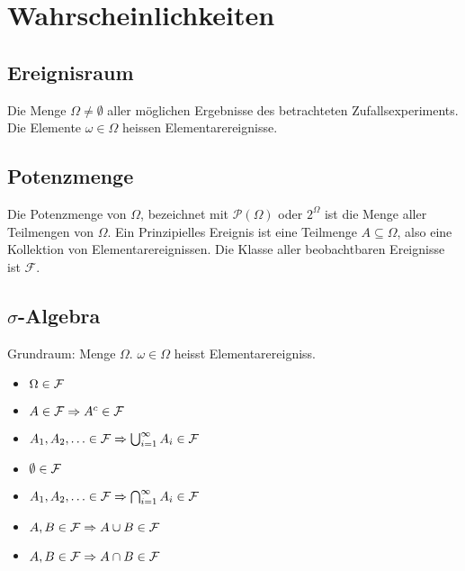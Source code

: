 

{\section{Wahrscheinlichkeiten}}
\subsection*{Ereignisraum}
Die Menge $\Omega \neq \emptyset$ aller möglichen Ergebnisse des betrachteten
Zufallsexperiments. Die Elemente $\omega \in \Omega$ heissen
Elementarereignisse.
\subsection*{Potenzmenge}
Die Potenzmenge von $\Omega$, bezeichnet mit $\mathcal{P} (\Omega)$ oder
$2^\Omega$ ist die Menge aller Teilmengen von $\Omega$. Ein Prinzipielles
Ereignis ist eine Teilmenge $A \subseteq \Omega$, also eine Kollektion von
Elementarereignissen. Die Klasse aller beobachtbaren Ereignisse ist
$\mathcal{F}$.
\subsection*{$\sigma$-Algebra}
Grundraum: Menge $\Omega$. $\omega \in \Omega$ heisst Elementarereigniss.
\begin{itemize}
  \item $\Omega \in \mathcal{F}$
  \item $A \in \mathcal{F} \Rightarrow A^c \in \mathcal{F}$
  \item $A_1 , A_2 , \ldots \in \mathcal{F} \Rightarrow \bigcup_{i=1}^\infty A_i \in \mathcal{F}$
  \item $\emptyset \in \mathcal{F}$
  \item $A_1 , A_2 , \ldots \in \mathcal{F} \Rightarrow \bigcap_{i=1}^\infty A_i \in \mathcal{F}$
  \item $A,B \in \mathcal{F} \Rightarrow A \cup B \in \mathcal{F}$
  \item $A,B \in \mathcal{F} \Rightarrow A \cap B \in \mathcal{F}$
\end{itemize}	


